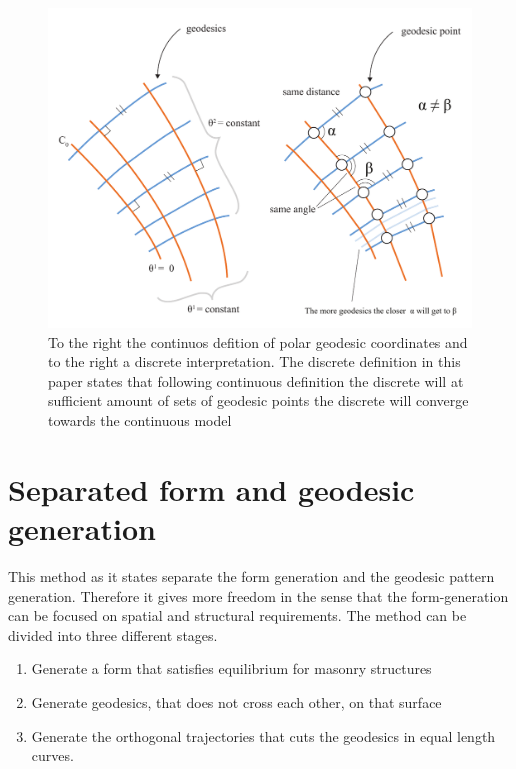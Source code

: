 \begin{figure}[H]
\centering
\includegraphics[width = 1.0\linewidth ]{figure/Method/diiscreteGeodesicCoord.pdf}
\caption{To the right the continuos defition of polar geodesic coordinates and to the right a discrete interpretation. The discrete definition in this paper states that following continuous definition the discrete will at sufficient amount of sets of geodesic points the discrete will converge towards the continuous model}
\end{figure}




\section{Separated form and geodesic generation}

This method as it states separate the form generation and the geodesic pattern generation. Therefore it gives more freedom in the sense that the form-generation can be focused on spatial and structural requirements. The method can be divided into three different stages.

\begin{enumerate}
\item Generate a form that satisfies equilibrium for masonry structures
\item Generate geodesics, that does not cross each other, on that surface
\item Generate the orthogonal trajectories that cuts the geodesics in equal length curves. 
\end{enumerate}

